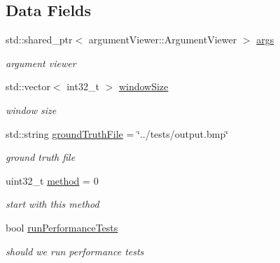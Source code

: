 \subsection*{Data Fields}
\begin{DoxyCompactItemize}
\item 
\mbox{\label{classArguments_a3ab231d51bfd73e74e92c7cc51e76410}} 
std\+::shared\+\_\+ptr$<$ argument\+Viewer\+::\+Argument\+Viewer $>$ \hyperlink{classArguments_a3ab231d51bfd73e74e92c7cc51e76410}{args}
\begin{DoxyCompactList}\small\item\em argument viewer \end{DoxyCompactList}\item 
\mbox{\label{classArguments_af7c3d8d81ed86f17cf968e34c4ebaac3}} 
std\+::vector$<$ int32\+\_\+t $>$ \hyperlink{classArguments_af7c3d8d81ed86f17cf968e34c4ebaac3}{window\+Size}
\begin{DoxyCompactList}\small\item\em window size \end{DoxyCompactList}\item 
\mbox{\label{classArguments_a9678e9bc1607e27fadce50ab428d9205}} 
std\+::string \hyperlink{classArguments_a9678e9bc1607e27fadce50ab428d9205}{ground\+Truth\+File} = \char`\"{}../tests/output.\+bmp\char`\"{}
\begin{DoxyCompactList}\small\item\em ground truth file \end{DoxyCompactList}\item 
\mbox{\label{classArguments_a042cf06e99bcb9637e150b5bb281f192}} 
uint32\+\_\+t \hyperlink{classArguments_a042cf06e99bcb9637e150b5bb281f192}{method} = 0
\begin{DoxyCompactList}\small\item\em start with this method \end{DoxyCompactList}\item 
\mbox{\label{classArguments_ac842663748666971780129ff56fd020f}} 
bool \hyperlink{classArguments_ac842663748666971780129ff56fd020f}{run\+Performance\+Tests}
\begin{DoxyCompactList}\small\item\em should we run performance tests \end{DoxyCompactList}\item 

\end{DoxyCompactItemize}
